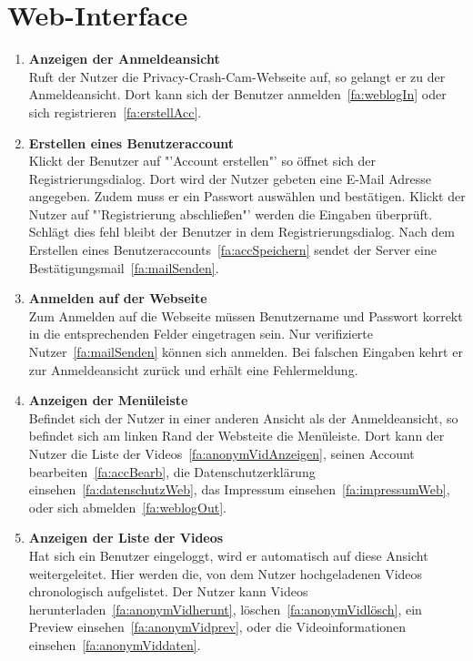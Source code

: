 




\section{\gls{Web-Interface}}
\begin{enumerate}
\renewcommand{\labelenumi}{\textbf{\theenumi}}
\renewcommand{\theenumi}{FA\arabic{enumi}0}
\setcounter{enumi}{299}
\item \label{fa:loginWeb} \textbf{Anzeigen der Anmeldeansicht} \hfill \\
Ruft der Nutzer die Privacy-Crash-Cam-Webseite auf, so gelangt er zu der Anmeldeansicht. Dort kann sich der Benutzer anmelden~\eqref{fa:weblogIn} oder sich registrieren~\eqref{fa:erstellAcc}.

\item \label{fa:erstellAcc}\textbf{Erstellen eines Benutzeraccount} \hfill \\
Klickt der Benutzer auf "'Account erstellen"' so öffnet sich der Registrierungsdialog. Dort wird der Nutzer gebeten eine \gls{E-Mail} Adresse angegeben. Zudem muss er ein Passwort auswählen und bestätigen. Klickt der Nutzer auf "'Registrierung abschließen"' werden die Eingaben überprüft. Schlägt dies fehl bleibt der Benutzer in dem Registrierungsdialog. Nach dem Erstellen eines Benutzeraccounts~\eqref{fa:accSpeichern} sendet der Server eine Bestätigungsmail~\eqref{fa:mailSenden}.

\item \label{fa:weblogIn}\textbf{Anmelden auf der Webseite} \hfill \\
Zum Anmelden auf die Webseite müssen Benutzername und Passwort korrekt in die entsprechenden Felder eingetragen sein. Nur verifizierte Nutzer~\eqref{fa:mailSenden} können sich anmelden. Bei falschen Eingaben kehrt er zur Anmeldeansicht zurück und erhält eine Fehlermeldung.

\item \textbf{Anzeigen der Menüleiste} \hfill \\
Befindet sich der Nutzer in einer anderen Ansicht als der Anmeldeansicht, so befindet sich am linken Rand der Websteite die Menüleiste. Dort kann der Nutzer die Liste der  Videos~\eqref{fa:anonymVidAnzeigen}, seinen Account bearbeiten~\eqref{fa:accBearb}, die Datenschutzerklärung einsehen~\eqref{fa:datenschutzWeb}, das Impressum einsehen~\eqref{fa:impressumWeb}, oder sich abmelden~\eqref{fa:weblogOut}.

\item \label{fa:anonymVidAnzeigen}\textbf{Anzeigen der Liste der  Videos} \hfill \\
Hat sich ein Benutzer eingeloggt, wird er automatisch auf diese Ansicht weitergeleitet. Hier werden die, von dem Nutzer hochgeladenen Videos chronologisch aufgelistet. Der Nutzer kann Videos herunterladen~\eqref{fa:anonymVidherunt}, löschen~\eqref{fa:anonymVidlösch}, ein Preview einsehen~\eqref{fa:anonymVidprev}, oder die Videoinformationen einsehen~\eqref{fa:anonymViddaten}.


\end{enumerate}
